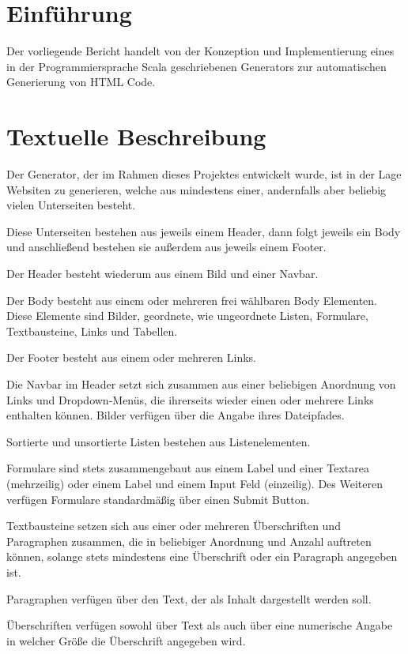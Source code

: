 \thispagestyle{plain}
\vspace*{2cm}
\section{Einführung}
Der vorliegende Bericht handelt von der Konzeption und Implementierung eines in der Programmiersprache Scala geschriebenen Generators zur automatischen Generierung von HTML Code. 


\section{Textuelle Beschreibung}
Der Generator, der im Rahmen dieses Projektes entwickelt wurde, ist in der Lage Websiten zu generieren, welche aus mindestens einer, andernfalls aber beliebig vielen Unterseiten besteht. 

Diese Unterseiten bestehen aus jeweils einem Header, dann folgt jeweils ein Body und anschließend bestehen sie außerdem aus jeweils einem Footer.

Der Header besteht wiederum aus einem Bild und einer Navbar.

Der Body besteht aus einem oder mehreren frei wählbaren Body Elementen. Diese Elemente sind Bilder, geordnete, wie ungeordnete Listen, Formulare, Textbausteine, Links und Tabellen.

Der Footer besteht aus einem oder mehreren Links.

Die Navbar im Header setzt sich zusammen aus einer beliebigen Anordnung von Links und Dropdown-Menüs, die ihrerseits wieder einen oder mehrere Links enthalten können.
Bilder verfügen über die Angabe ihres Dateipfades.

Sortierte und unsortierte Listen bestehen aus Listenelementen.

Formulare sind stets zusammengebaut aus einem Label und einer Textarea (mehrzeilig) oder einem Label und einem Input Feld (einzeilig). Des Weiteren verfügen Formulare standardmäßig über einen Submit Button.

Textbausteine setzen sich aus einer oder mehreren Überschriften und Paragraphen zusammen, die in beliebiger Anordnung und Anzahl auftreten können, solange stets mindestens eine Überschrift oder ein Paragraph angegeben ist.

Paragraphen verfügen über den Text, der als Inhalt dargestellt werden soll.

Überschriften verfügen sowohl über Text als auch über eine numerische Angabe in welcher Größe die Überschrift angegeben wird.

